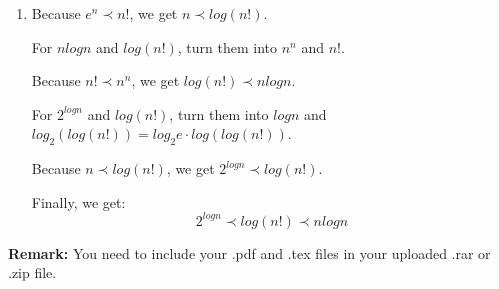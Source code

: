 \documentclass[12pt,a4paper]{article}
\makeatletter
\newtheorem*{solution}{Solution}
\theoremstyle{definition}
\renewenvironment{solution}[1][Solution] {\par\pushQED{\qed}\normalfont\topsep6\p@\@plus6\p@\relax\trivlist\item[\hskip\labelsep\bfseries#1\@addpunct{.}]\ignorespaces}{\popQED\endtrivlist\@endpefalse} \makeatother
\makeatother
\begin{document}
\begin{enumerate}
\begin{solution}
Because $e^n\prec n!$, we get $n\prec log(n!)$.

For $nlogn$ and $log(n!)$, turn them into $n^n$ and $n!$.

Because $n!\prec n^n$, we get $log(n!) \prec nlogn$.

For $2^{logn}$ and $log(n!)$, turn them into $logn$ and $log_2(log(n!)) =log_2e \cdot log(log(n!))$.

Because $n\prec log(n!)$, we get $2^{logn}\prec log(n!)$.

Finally, we get:
$$
2^{logn}\prec log(n!) \prec nlogn
$$
 \end{solution}


\end{enumerate}

\vspace{20pt}

\textbf{Remark:} You need to include your .pdf and .tex files in your uploaded .rar or .zip file.

\end{document}
